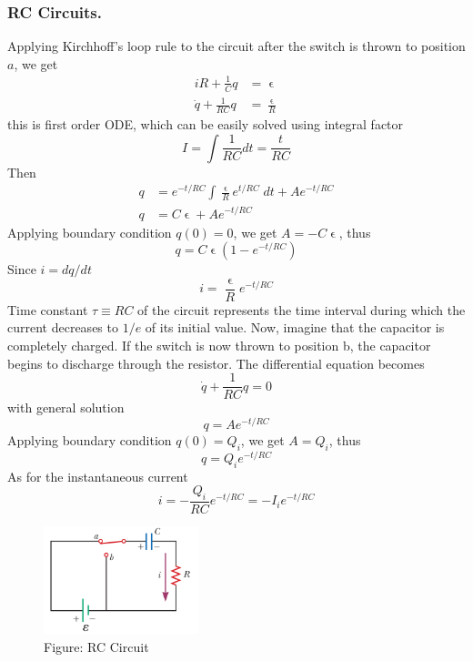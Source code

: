 \documentclass[../../../main.tex]{subfiles}
\begin{document}
\subsubsection*{RC Circuits.} Applying Kirchhoff’s loop rule to the circuit after the switch is thrown to position $a$, we get 
\begin{align*}
    iR+\frac{1}{C}q&=\upvarepsilon\\
    \dot{q}+\frac{1}{RC}q&=\frac{\upvarepsilon}{R}
\end{align*}
this is first order ODE, which can be easily solved using integral factor
\begin{equation*}
    I=\int \frac{1}{RC}dt=\frac{t}{RC}
\end{equation*} 
Then
\begin{align*}
    q&=e^{-t/RC}\int \frac{\upvarepsilon}{R}e^{t/RC}\;dt+Ae^{-t/RC}\\
    q&=C\upvarepsilon+Ae^{-t/RC}
\end{align*}
Applying boundary condition $q(0)=0$, we get $A=-C\upvarepsilon$, thus 
\begin{equation*}
    q=C\upvarepsilon(1-e^{-t/RC})
\end{equation*}
Since $i=dq/dt$
\begin{equation*}
    i=\frac{\upvarepsilon}{R}e^{-t/RC}
\end{equation*}
Time constant $\tau\equiv RC$ of the circuit represents the time interval during which the current decreases to $1/e$ of its initial value. Now, imagine that the capacitor is completely charged. If the switch is now thrown to position b, the capacitor begins to discharge through the resistor. The differential equation becomes
\begin{equation*}   
    \dot{q}+\frac{1}{RC}q=0
\end{equation*}
with general solution 
\begin{equation*}
    q=Ae^{-t/RC}
\end{equation*}
Applying boundary condition $q(0)=Q_i$, we get $A=Q_i$, thus 
\begin{equation*}
    q=Q_ie^{-t/RC}
\end{equation*}
As for the instantaneous current
\begin{equation*}
i=-\frac{Q_i}{RC}e^{-t/RC}=-I_ie^{-t/RC}
\end{equation*}
\begin{figure}
    \centering
    \includegraphics[width=0.4\textwidth]{../Rss/Electromagnetism/Electrodynamics/RCCirc.png}
    \caption*{Figure: RC Circuit}
\end{figure}
\end{document}
